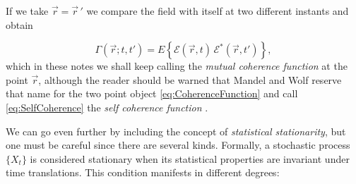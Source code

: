 	If we take $\vec{r}=\vec{r}\,'$ we compare the field with itself at two different
	instants and obtain

	\begin{equation}\label{eq:SelfCoherence}
		\Gamma(\vec{r};t,t') = E \left\{ \mathcal{E}(\vec{r},t)\, \mathcal{E}^*(\vec{r},t') \right\},
	\end{equation}
	which in these notes we shall keep calling the \textit{mutual coherence function} at the
	point $\vec{r}$, although the reader should be warned that Mandel and Wolf reserve that
	name for the two point object \eqref{eq:CoherenceFunction} and call
	\eqref{eq:SelfCoherence} the \textit{self coherence function}
	\citep{mandel1995optical}.

	We can go even further by including the concept of \textit{statistical stationarity}, but
	one must be careful since there are several kinds. Formally, a stochastic process
	$\{X_t\}$ is considered stationary when its statistical properties are invariant under
	time translations. This condition manifests in different degrees:

